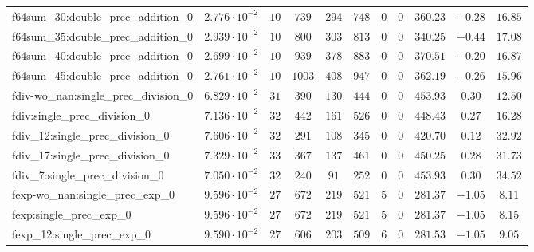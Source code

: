\begin{tabular}{|l|c|c|c|c|c|c|c|c|c|c|}
f64sum\_30:double\_prec\_addition\_0           & $ 2.776 \cdot 10^{-2} $ & $ 10     $ & $ 739    $ & $ 294   $ & $ 748    $ & $ 0   $ & $ 0 $ & $ 360.23      $ & $ -0.28   $ & $ 16.85   $ \\
f64sum\_35:double\_prec\_addition\_0           & $ 2.939 \cdot 10^{-2} $ & $ 10     $ & $ 800    $ & $ 303   $ & $ 813    $ & $ 0   $ & $ 0 $ & $ 340.25      $ & $ -0.44   $ & $ 17.08   $ \\
f64sum\_40:double\_prec\_addition\_0           & $ 2.699 \cdot 10^{-2} $ & $ 10     $ & $ 939    $ & $ 378   $ & $ 883    $ & $ 0   $ & $ 0 $ & $ 370.51      $ & $ -0.20   $ & $ 16.87   $ \\
f64sum\_45:double\_prec\_addition\_0           & $ 2.761 \cdot 10^{-2} $ & $ 10     $ & $ 1003   $ & $ 408   $ & $ 947    $ & $ 0   $ & $ 0 $ & $ 362.19      $ & $ -0.26   $ & $ 15.96   $ \\
fdiv-wo\_nan:single\_prec\_division\_0         & $ 6.829 \cdot 10^{-2} $ & $ 31     $ & $ 390    $ & $ 130   $ & $ 444    $ & $ 0   $ & $ 0 $ & $ 453.93      $ & $ 0.30    $ & $ 12.50   $ \\
fdiv:single\_prec\_division\_0                 & $ 7.136 \cdot 10^{-2} $ & $ 32     $ & $ 442    $ & $ 161   $ & $ 526    $ & $ 0   $ & $ 0 $ & $ 448.43      $ & $ 0.27    $ & $ 16.28   $ \\
fdiv\_12:single\_prec\_division\_0             & $ 7.606 \cdot 10^{-2} $ & $ 32     $ & $ 291    $ & $ 108   $ & $ 345    $ & $ 0   $ & $ 0 $ & $ 420.70      $ & $ 0.12    $ & $ 32.92   $ \\
fdiv\_17:single\_prec\_division\_0             & $ 7.329 \cdot 10^{-2} $ & $ 33     $ & $ 367    $ & $ 137   $ & $ 461    $ & $ 0   $ & $ 0 $ & $ 450.25      $ & $ 0.28    $ & $ 31.73   $ \\
fdiv\_7:single\_prec\_division\_0              & $ 7.050 \cdot 10^{-2} $ & $ 32     $ & $ 240    $ & $ 91    $ & $ 252    $ & $ 0   $ & $ 0 $ & $ 453.93      $ & $ 0.30    $ & $ 34.52   $ \\
fexp-wo\_nan:single\_prec\_exp\_0              & $ 9.596 \cdot 10^{-2} $ & $ 27     $ & $ 672    $ & $ 219   $ & $ 521    $ & $ 5   $ & $ 0 $ & $ 281.37      $ & $ -1.05   $ & $ 8.11    $ \\
fexp:single\_prec\_exp\_0                      & $ 9.596 \cdot 10^{-2} $ & $ 27     $ & $ 672    $ & $ 219   $ & $ 521    $ & $ 5   $ & $ 0 $ & $ 281.37      $ & $ -1.05   $ & $ 8.15    $ \\
fexp\_12:single\_prec\_exp\_0                  & $ 9.590 \cdot 10^{-2} $ & $ 27     $ & $ 606    $ & $ 203   $ & $ 509    $ & $ 6   $ & $ 0 $ & $ 281.53      $ & $ -1.05   $ & $ 9.05    $ \\

\end{tabular}
